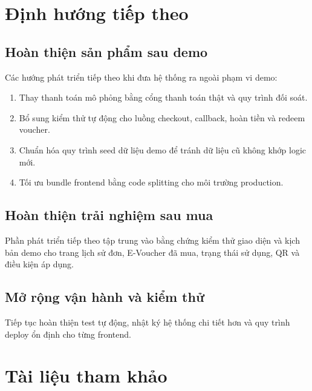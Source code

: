 \section{Định hướng tiếp theo}

\subsection{Hoàn thiện sản phẩm sau demo}

Các hướng phát triển tiếp theo khi đưa hệ thống ra ngoài phạm vi demo:

\begin{enumerate}[leftmargin=1.2cm]
    \item Thay thanh toán mô phỏng bằng cổng thanh toán thật và quy trình đối soát.
    \item Bổ sung kiểm thử tự động cho luồng checkout, callback, hoàn tiền và redeem voucher.
    \item Chuẩn hóa quy trình seed dữ liệu demo để tránh dữ liệu cũ không khớp logic mới.
    \item Tối ưu bundle frontend bằng code splitting cho môi trường production.
\end{enumerate}

\subsection{Hoàn thiện trải nghiệm sau mua}

Phần phát triển tiếp theo tập trung vào bằng chứng kiểm thử giao diện và kịch bản demo cho trang lịch sử đơn, E-Voucher đã mua, trạng thái sử dụng, QR và điều kiện áp dụng.

\subsection{Mở rộng vận hành và kiểm thử}

Tiếp tục hoàn thiện test tự động, nhật ký hệ thống chi tiết hơn và quy trình deploy ổn định cho từng frontend.

\section{Tài liệu tham khảo}

